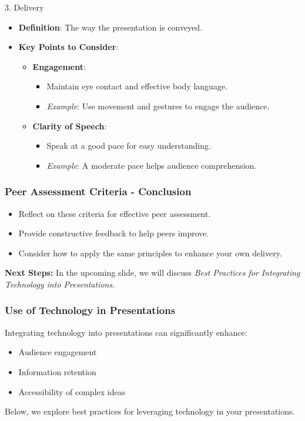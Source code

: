 \documentclass[aspectratio=169]{beamer}
\begin{document}
\begin{frame}[fragile]
    \begin{block}{3. Delivery}
        \begin{itemize}
            \item \textbf{Definition}: The way the presentation is conveyed.
            \item \textbf{Key Points to Consider}:
                \begin{itemize}
                    \item \textbf{Engagement}:
                        \begin{itemize}
                            \item Maintain eye contact and effective body language.
                            \item \textit{Example}: Use movement and gestures to engage the audience.
                        \end{itemize}
                    \item \textbf{Clarity of Speech}:
                        \begin{itemize}
                            \item Speak at a good pace for easy understanding.
                            \item \textit{Example}: A moderate pace helps audience comprehension.
                        \end{itemize}
                \end{itemize}
        \end{itemize}
    \end{block}
\end{frame}

\begin{frame}[fragile]
    \frametitle{Peer Assessment Criteria - Conclusion}
    \begin{itemize}
        \item Reflect on these criteria for effective peer assessment.
        \item Provide constructive feedback to help peers improve.
        \item Consider how to apply the same principles to enhance your own delivery.
    \end{itemize}
    
    \textbf{Next Steps:} 
    In the upcoming slide, we will discuss \textit{Best Practices for Integrating Technology into Presentations}.
\end{frame}

\begin{frame}[fragile]
    \frametitle{Use of Technology in Presentations}
    Integrating technology into presentations can significantly enhance:
    \begin{itemize}
        \item Audience engagement
        \item Information retention
        \item Accessibility of complex ideas
    \end{itemize}
    Below, we explore best practices for leveraging technology in your presentations.
\end{frame}
\end{document}
